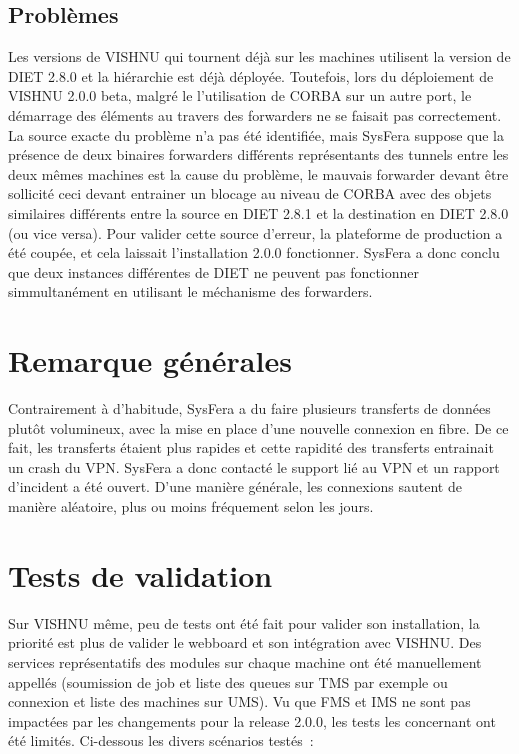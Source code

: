 \documentclass{article}
\begin{document}
\subsection{Probl\`emes}
Les versions de VISHNU qui tournent d\'ej\`a sur les machines utilisent
la version de DIET 2.8.0 et la hi\'erarchie est d\'ej\`a d\'eploy\'ee.
Toutefois, lors du d\'eploiement de VISHNU 2.0.0 beta, malgré le 
l'utilisation de CORBA sur un autre port, le démarrage des 
\'el\'ements au travers des forwarders ne se faisait pas correctement.
La source exacte du probl\`eme n'a pas \'et\'e identifi\'ee, mais 
SysFera suppose que la pr\'esence de deux binaires forwarders diff\'erents
repr\'esentants des tunnels entre les deux m\^emes machines est la
cause du probl\`eme, le mauvais forwarder devant \^etre sollicit\'e 
ceci devant entrainer un blocage au niveau de CORBA avec des objets 
similaires diff\'erents entre la source en DIET 2.8.1 et la destination
en DIET 2.8.0 (ou vice versa). 
Pour valider cette source d'erreur, la plateforme de production a 
\'et\'e coup\'ee, et cela laissait l'installation 2.0.0 fonctionner.
SysFera a donc conclu que deux instances diff\'erentes de DIET ne peuvent 
pas fonctionner simmultan\'ement en utilisant le m\'echanisme des
forwarders.

\section{Remarque g\'en\'erales}
Contrairement \`a d'habitude, SysFera a du faire plusieurs 
transferts de donn\'ees plut\^ot volumineux, avec la mise en
place d'une nouvelle connexion en fibre. De ce fait, les 
transferts \'etaient plus rapides et cette rapidit\'e des 
transferts entrainait un crash du VPN. SysFera a donc
contact\'e le support li\'e au VPN et un rapport d'incident 
a \'et\'e ouvert. D'une mani\`ere g\'en\'erale, les connexions sautent
de mani\`ere al\'eatoire, plus ou moins fr\'equement selon les jours.

\section{Tests de validation}
Sur VISHNU m\^eme, peu de tests ont \'et\'e fait pour valider 
son installation, la priorit\'e est plus de valider le webboard
et son int\'egration avec VISHNU. Des services repr\'esentatifs des modules 
sur chaque machine ont \'et\'e manuellement appell\'es 
(soumission de job et liste des queues sur TMS par exemple ou 
connexion et liste des machines sur UMS). Vu que FMS et IMS ne sont
pas impact\'ees par les changements pour la release 2.0.0, les tests
les concernant ont \'et\'e limit\'es.
Ci-dessous les divers sc\'enarios test\'es~:
\end{document}
